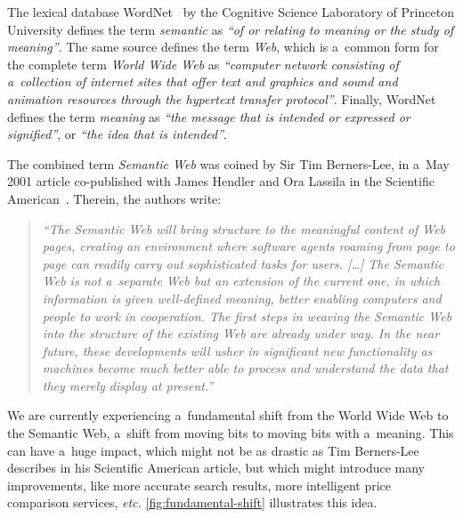 The lexical database
WordNet~\cite{fellbaum1998wordnet,miller1995wordnet}
by the Cognitive Science Laboratory
of Princeton University defines the term \emph{semantic}
as \emph{``of or relating to meaning or the study of meaning''}.
The same source defines the term \emph{Web},
which is a~common form for the complete term
\emph{World Wide Web} as
\emph{``computer network consisting of a~collection of internet sites that offer text and graphics and
sound and animation resources through the hypertext
transfer protocol''}.
Finally, WordNet defines the term \emph{meaning}
as \emph{``the message that is intended or expressed
or signified''}, or \emph{``the idea that is intended''}.

The combined term \emph{Semantic Web} was coined
by Sir Tim Berners-Lee,
in a~May 2001 article co-published with James Hendler
and Ora Lassila
in the Scientific American~\cite{bernerslee2001semanticweb}.
Therein, the authors write: 

\begin{quotation}
\textit{``The Semantic Web will bring structure to the meaningful
content of Web pages,
creating an environment where software agents
roaming from page to page
can readily carry out sophisticated tasks for users. [\ldots]
The Semantic Web is not a~separate Web
but an extension of the current one,
in which information is given well-defined meaning,
better enabling computers and people
to work in cooperation.
The first steps in weaving the Semantic Web
into the structure of the existing Web
are already under way.
In the near future, these developments
will usher in significant new functionality
as machines become much better able to process and \emph{understand} the data
that they merely display at present.''}
\end{quotation}

We are currently experiencing a~fundamental shift
from the World Wide Web to the Semantic Web,
a~shift from moving bits to moving bits with a~meaning.
This can have a~huge impact,
which might not be as drastic as Tim Berners-Lee describes
in his Scientific American article,
but which might introduce many improvements,
like more accurate search results,
more intelligent price comparison services, \emph{etc.}
\autoref{fig:fundamental-shift} illustrates this idea.

